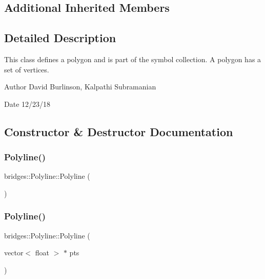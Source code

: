 \subsection*{Additional Inherited Members}


\subsection{Detailed Description}
This class defines a polygon and is part of the symbol collection. A polygon has a set of vertices. 

\begin{DoxyAuthor}{Author}
David Burlinson, Kalpathi Subramanian 
\end{DoxyAuthor}
\begin{DoxyDate}{Date}
12/23/18 
\end{DoxyDate}


\subsection{Constructor \& Destructor Documentation}
\mbox{\label{classbridges_1_1_polyline_a34e2defd0e7e1a95bef282ff43ce478b}} 
\subsubsection{\texorpdfstring{Polyline()}{Polyline()}\hspace{0.1cm}{\footnotesize\ttfamily [1/2]}}
{\footnotesize\ttfamily bridges\+::\+Polyline\+::\+Polyline (\begin{DoxyParamCaption}{ }\end{DoxyParamCaption})\hspace{0.3cm}{\ttfamily [inline]}}

\mbox{\label{classbridges_1_1_polyline_a332ddf6a9136701ce2502ab5b2805d9c}} 
\subsubsection{\texorpdfstring{Polyline()}{Polyline()}\hspace{0.1cm}{\footnotesize\ttfamily [2/2]}}
{\footnotesize\ttfamily bridges\+::\+Polyline\+::\+Polyline (\begin{DoxyParamCaption}\item[{vector$<$ float $>$ $\ast$}]{pts }\end{DoxyParamCaption})\hspace{0.3cm}{\ttfamily [inline]}}




